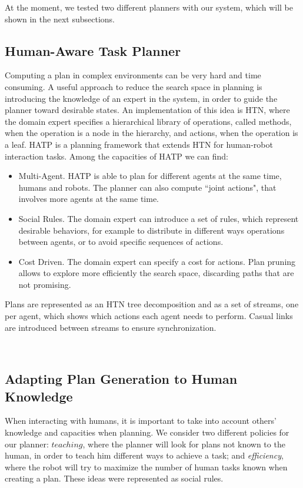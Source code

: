 At the moment, we tested two different planners with our system, which will be shown in the next subsections.


\subsection{Human-Aware Task Planner}
\label{subsec:plan_management-hatp}
Computing a plan in complex environments can be very hard and time consuming. A useful approach to reduce the search space in planning is introducing the knowledge of an expert in the system, in order to guide the planner toward desirable states. An implementation of this idea is HTN, where the domain expert specifies a hierarchical library of operations, called methods, when the operation is a node in the hierarchy, and actions, when the operation is a leaf. HATP is a planning framework that extends HTN for human-robot interaction tasks. Among the capacities of HATP we can find:
\begin{itemize}
\item Multi-Agent. HATP is able to plan for different agents at the same time, humans and robots. The planner can also compute ``joint actions", that involves more agents at the same time.
\item Social Rules. The domain expert can introduce a set of rules, which represent desirable behaviors, for example to distribute in different ways operations between agents, or to avoid specific sequences of actions.
\item Cost Driven. The domain expert can specify a cost for actions. Plan pruning allows to explore more efficiently the search space, discarding paths that are not promising.
\end{itemize} 

Plans are represented as an HTN tree decomposition and as a set of streams, one per agent, which shows which actions each agent needs to perform. Casual links are introduced between streams to ensure synchronization.

\

\subsection{Adapting Plan Generation to Human Knowledge}
\label{subsec:plan_generation-adapting_knowledge}
When interacting with humans, it is important to take into account others' knowledge and capacities when planning. We consider two different policies for our planner: $teaching$, where the planner will look for plans not known to the human, in order to teach him different ways to achieve a task; and \textit{efficiency}, where the robot will try to maximize the number of human tasks known when creating a plan. These ideas were represented as social rules.


